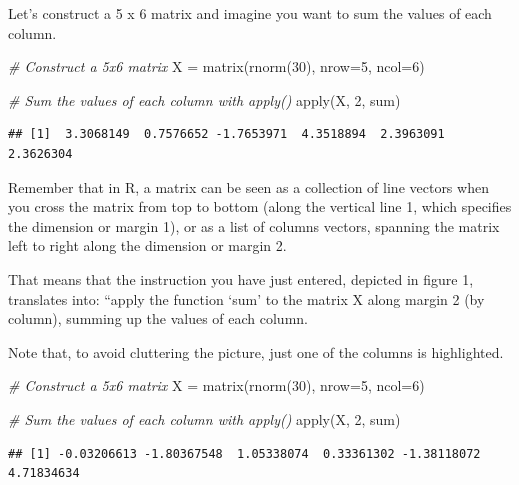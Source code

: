 \documentclass[
]{book}
\newenvironment{Shaded}{\begin{snugshade}}{\end{snugshade}}
\newcommand{\AttributeTok}[1]{\textcolor[rgb]{0.77,0.63,0.00}{#1}}
\newcommand{\CommentTok}[1]{\textcolor[rgb]{0.56,0.35,0.01}{\textit{#1}}}
\newcommand{\DecValTok}[1]{\textcolor[rgb]{0.00,0.00,0.81}{#1}}
\newcommand{\FunctionTok}[1]{\textcolor[rgb]{0.00,0.00,0.00}{#1}}
\newcommand{\NormalTok}[1]{#1}
\newcommand{\OtherTok}[1]{\textcolor[rgb]{0.56,0.35,0.01}{#1}}
\theoremstyle{definition}
\theoremstyle{definition}
\theoremstyle{definition}
\theoremstyle{definition}
\theoremstyle{remark}
\begin{document}
Let's construct a 5 x 6 matrix and imagine you want to sum the values of each column.

\begin{Shaded}
\begin{Highlighting}[]
\CommentTok{\# Construct a 5x6 matrix}
\NormalTok{X }\OtherTok{=} \FunctionTok{matrix}\NormalTok{(}\FunctionTok{rnorm}\NormalTok{(}\DecValTok{30}\NormalTok{), }\AttributeTok{nrow=}\DecValTok{5}\NormalTok{, }\AttributeTok{ncol=}\DecValTok{6}\NormalTok{)}

\CommentTok{\# Sum the values of each column with \textasciigrave{}apply()\textasciigrave{}}
\FunctionTok{apply}\NormalTok{(X, }\DecValTok{2}\NormalTok{, sum)}
\end{Highlighting}
\end{Shaded}

\begin{verbatim}
## [1]  3.3068149  0.7576652 -1.7653971  4.3518894  2.3963091  2.3626304
\end{verbatim}

Remember that in R, a matrix can be seen as a collection of line vectors when you cross the matrix from top to bottom (along the vertical line 1, which specifies the dimension or margin 1), or as a list of columns vectors, spanning the matrix left to right along the dimension or margin 2.

That means that the instruction you have just entered, depicted in figure 1, translates into: ``apply the function `sum' to the matrix X along margin 2 (by column), summing up the values of each column.

Note that, to avoid cluttering the picture, just one of the columns is highlighted.

\begin{Shaded}
\begin{Highlighting}[]
\CommentTok{\# Construct a 5x6 matrix}
\NormalTok{X }\OtherTok{=} \FunctionTok{matrix}\NormalTok{(}\FunctionTok{rnorm}\NormalTok{(}\DecValTok{30}\NormalTok{), }\AttributeTok{nrow=}\DecValTok{5}\NormalTok{, }\AttributeTok{ncol=}\DecValTok{6}\NormalTok{)}

\CommentTok{\# Sum the values of each column with \textasciigrave{}apply()\textasciigrave{}}
\FunctionTok{apply}\NormalTok{(X, }\DecValTok{2}\NormalTok{, sum)}
\end{Highlighting}
\end{Shaded}

\begin{verbatim}
## [1] -0.03206613 -1.80367548  1.05338074  0.33361302 -1.38118072  4.71834634
\end{verbatim}
\end{document}
